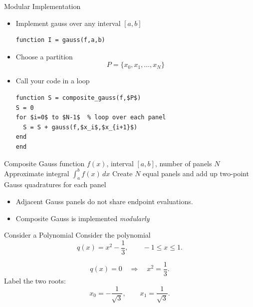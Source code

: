 \documentclass[10pt]{beamer}
\begin{document}
\begin{frame}[fragile]{Modular Implementation}

\begin{itemize}
    
    \item Implement gauss over any interval $[a,b]$
\begin{lstlisting}[mathescape]
function I = gauss(f,a,b)
\end{lstlisting}

    \item Choose a partition 
    $$
        P=\{x_0,x_1,\dots,x_N\}
    $$

    \item Call your code in a loop
\begin{lstlisting}[mathescape]
function S = composite_gauss(f,$P$)
S = 0
for $i=0$ to $N-1$  % loop over each panel
  S = S + gauss(f,$x_i$,$x_{i+1}$)
end
end
\end{lstlisting}
\end{itemize}
\end{frame}


\begin{frame}{Composite Gauss}
    {function $f(x)$, interval $[a,b]$, number of panels $N$}
    {Approximate integral $\int_a^b f(x)\,dx$}
    {Create $N$ equal panels and add up two-point Gauss quadratures for each panel}
    \vspace{3mm}
    \begin{itemize}
        \item Adjacent Gauss panels do not share endpoint evaluations.
        \item Composite Gauss is implemented \textit{modularly}
    \end{itemize}
\end{frame}



\begin{frame}{Consider a Polynomial}
Consider the polynomial
\[
    q(x)=x^2-\frac13,\qquad -1\le x\le1.
\]

\[
    q(x)=0
    \quad\Longrightarrow\quad x^2=\frac13.
\]
Label the two roots:
\[
    x_0=-\frac1{\sqrt3},
    \qquad x_1=\frac1{\sqrt3}.
\]
\end{frame}
\end{document}
